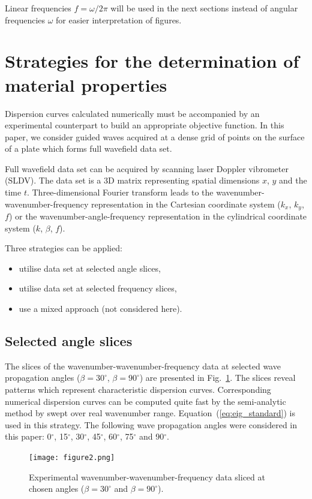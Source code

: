 \documentclass[preprint,12pt]{elsarticle}
\begin{document}
Linear frequencies $f=\omega/2 \pi$ will be used in the next sections instead of angular frequencies $\omega$ for easier interpretation of figures.
\section{Strategies for the determination of material properties \label{sec:strategies}}
Dispersion curves calculated numerically must be accompanied by an experimental counterpart to build an appropriate objective function. 
In this paper, we consider guided waves acquired at a dense grid of points on the surface of a plate which forms full wavefield data set. 

Full wavefield data set can be acquired by scanning laser Doppler vibrometer (SLDV).
The data set is a 3D matrix representing spatial dimensions $x$, $y$ and the time $t$. 
Three-dimensional Fourier transform leads to the wavenumber-wavenumber-frequency representation  in the Cartesian coordinate system ($k_x$, $k_y$, $f$) or the wavenumber-angle-frequency representation in the cylindrical coordinate system ($k$, $\beta$, $f$).

Three strategies can be applied:
\begin{itemize}
	\item utilise data set at selected angle slices,
	\item utilise data set at selected frequency slices,
	\item use a mixed approach (not considered here).
\end{itemize}
\subsection{Selected angle slices}
The slices of the wavenumber-wavenumber-frequency data at selected wave propagation angles ($\beta=30^{\circ}$, $\beta=90^{\circ}$) are presented in Fig.~\ref{fig:angle_slice}. 
The slices reveal patterns which represent characteristic dispersion curves. 
Corresponding numerical dispersion curves can be computed quite fast by the semi-analytic method by swept over real wavenumber range.
Equation~(\ref{eq:eig_standard}) is used in this strategy.
The following wave propagation angles were considered in this paper: 0$^{\circ}$, 15$^{\circ}$, 30$^{\circ}$, 45$^{\circ}$, 60$^{\circ}$, 75$^{\circ}$ and 90$^{\circ}$.
\begin{figure} [h!]
	\centering
	\texttt{[image: figure2.png]}	
	\caption{Experimental wavenumber-wavenumber-frequency data sliced at chosen angles ($\beta=30^{\circ}$ and $\beta=90^{\circ}$).}
	\label{fig:angle_slice}
\end{figure}
\end{document}
